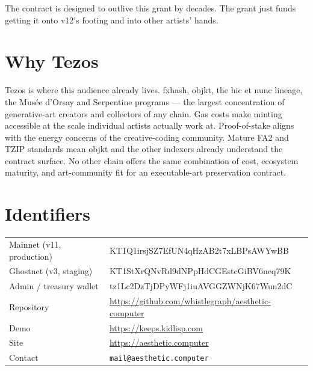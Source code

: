 \documentclass[11pt]{article}
\newcommand{\addr}[1]{{\acberkeley\small #1}}
\begin{document}
The contract is designed to outlive this grant by decades. The grant just funds getting it onto v12's footing and into other artists' hands.

\section*{Why Tezos}

Tezos is where this audience already lives. fxhash, objkt, the hic et nunc lineage, the Musée d'Orsay and Serpentine programs --- the largest concentration of generative-art creators and collectors of any chain. Gas costs make minting accessible at the scale individual artists actually work at. Proof-of-stake aligns with the energy concerns of the creative-coding community. Mature FA2 and TZIP standards mean objkt and the other indexers already understand the contract surface. No other chain offers the same combination of cost, ecosystem maturity, and art-community fit for an executable-art preservation contract.

\section*{Identifiers}

\begin{tabularx}{\linewidth}{@{}l X@{}}
\addr{Mainnet (v11, production)} & \addr{KT1Q1irsjSZ7EfUN4qHzAB2t7xLBPsAWYwBB} \\
\addr{Ghostnet (v3, staging)} & \addr{KT1StXrQNvRd9dNPpHdCGEstcGiBV6neq79K} \\
\addr{Admin / treasury wallet} & \addr{tz1Lc2DzTjDPyWFj1iuAVGGZWNjK67Wun2dC} \\
\addr{Repository} & \url{https://github.com/whistlegraph/aesthetic-computer} \\
\addr{Demo} & \url{https://keeps.kidlisp.com} \\
\addr{Site} & \url{https://aesthetic.computer} \\
\addr{Contact} & \texttt{mail@aesthetic.computer} \\
\end{tabularx}
\end{document}
